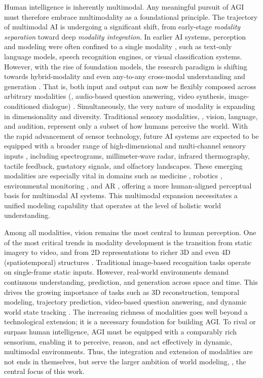 Human intelligence is inherently multimodal. 
Any meaningful pursuit of AGI must therefore embrace multimodality as a foundational principle. 
The trajectory of multimodal AI is undergoing a significant shift, from early-stage \emph{modality separation} toward deep \emph{modality integration}. 
In earlier AI systems, perception and modeling were often confined to a single modality \cite{he2016deep}, such as text-only language models, speech recognition engines, or visual classification systems. 
However, with the rise of foundation models, the research paradigm is shifting towards hybrid-modality \cite{lu2019vilbert,tan2019lxmert} and even any-to-any cross-modal understanding and generation \cite{wu2024next}. 
That is, both input and output can now be flexibly composed across arbitrary modalities (\eg, audio-based question answering, video synthesis, image-conditioned dialogue) \cite{yan2021videogpt,yun2021pano,zhang2024dialogstudio}.
Simultaneously, the very nature of modality is expanding in dimensionality and diversity. 
Traditional sensory modalities, \eg, vision, language, and audition, represent only a subset of how humans perceive the world. 
With the rapid advancement of sensor technology, future AI systems are expected to be equipped with a broader range of high-dimensional and multi-channel sensory inputs \cite{li2020review,liu2023multimodal,park2023cross,salih2024odors}, including spectrograms, millimeter-wave radar, infrared thermography, tactile feedback, gustatory signals, and olfactory landscapes. 
These emerging modalities are especially vital in domains such as medicine \cite{topol2019high}, robotics \cite{Levine2016DeepGrasp}, environmental monitoring \cite{alotaibi2024artificial}, and AR \cite{nizam2018review}, offering a more human-aligned perceptual basis for multimodal AI systems. 
This multimodal expansion necessitates a unified modeling capability that operates at the level of holistic world understanding.




Among all modalities, vision remains the most central to human perception. 
One of the most critical trends in modality development is the transition from static imagery to video, and from 2D representations to richer 3D and even 4D (spatiotemporal) structures \cite{saxena2008make3d,peng2023openscene}. 
Traditional image-based recognition tasks operate on single-frame static inputs. 
However, real-world environments demand continuous understanding, prediction, and generation across space and time. 
This drives the growing importance of tasks such as 3D reconstruction, temporal modeling, trajectory prediction, video-based question answering, and dynamic world state tracking \cite{ciaparrone2020deep,azuma2022scanqa}. 
The increasing richness of modalities goes well beyond a technological extension; it is a necessary foundation for building AGI.
To rival or surpass human intelligence, AGI must be equipped with a comparably rich sensorium, enabling it to perceive, reason, and act effectively in dynamic, multimodal environments. 
Thus, the integration and extension of modalities are not ends in themselves, but serve the larger ambition of world modeling, \ie, the central focus of this work.




